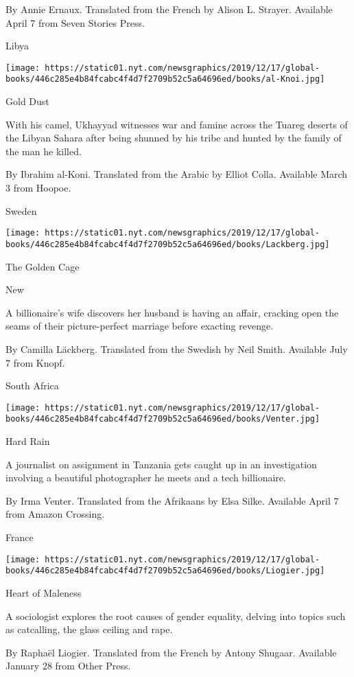  By Annie Ernaux. Translated from the French by Alison L. Strayer.
Available April 7 from Seven Stories Press.

Libya

\texttt{[image: https://static01.nyt.com/newsgraphics/2019/12/17/global-books/446c285e4b84fcabc4f4d7f2709b52c5a64696ed/books/al-Knoi.jpg]}

Gold Dust

With his camel, Ukhayyad witnesses war and famine across the Tuareg
deserts of the Libyan Sahara after being shunned by his tribe and hunted
by the family of the man he killed.

 By Ibrahim al-Koni. Translated from the Arabic by Elliot Colla.
Available March 3 from Hoopoe.

Sweden

\texttt{[image: https://static01.nyt.com/newsgraphics/2019/12/17/global-books/446c285e4b84fcabc4f4d7f2709b52c5a64696ed/books/Lackberg.jpg]}

The Golden Cage

New

A billionaire's wife discovers her husband is having an affair, cracking
open the seams of their picture-perfect marriage before exacting
revenge.

 By Camilla Läckberg. Translated from the Swedish by Neil Smith.
Available July 7 from Knopf.

South Africa

\texttt{[image: https://static01.nyt.com/newsgraphics/2019/12/17/global-books/446c285e4b84fcabc4f4d7f2709b52c5a64696ed/books/Venter.jpg]}

Hard Rain

A journalist on assignment in Tanzania gets caught up in an
investigation involving a beautiful photographer he meets and a tech
billionaire.

 By Irma Venter. Translated from the Afrikaans by Elsa Silke. Available
April 7 from Amazon Crossing.

France

\texttt{[image: https://static01.nyt.com/newsgraphics/2019/12/17/global-books/446c285e4b84fcabc4f4d7f2709b52c5a64696ed/books/Liogier.jpg]}

Heart of Maleness

A sociologist explores the root causes of gender equality, delving into
topics such as catcalling, the glass ceiling and rape.

 By Raphaël Liogier. Translated from the French by Antony Shugaar.
Available January 28 from Other Press.

